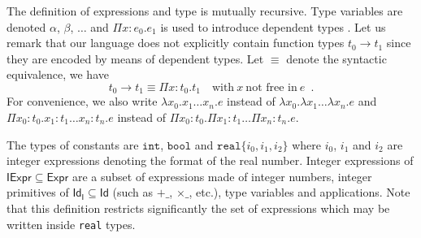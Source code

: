 The definition of expressions and type is mutually recursive.
 Type variables are denoted $\alpha$, $\beta$, $\ldots$
and $\Pi x:e_0.e_1$ is used to introduce dependent types \cite{Pie04}. 
Let us remark that our language does not explicitly contain function types $t_0 \rightarrow t_1$
since they are encoded by means of dependent types. Let $\equiv$ denote the syntactic equivalence, we have
\begin{equation}
t_0\rightarrow t_1  \equiv \Pi x:t_0.t_1\quad\text{with}\ x\ \text{not free in}\ e\enspace .
\end{equation}
For convenience, we also write $\lambda x_0.x_1\ldots x_n.e$ instead of
$\lambda x_0.\lambda x_1\ldots\lambda x_n.e$ and 
$\Pi x_0:t_0.x_1:t_1\ldots x_n:t_n.e$ instead of
$\Pi x_0:t_0.\Pi x_1:t_1\ldots \Pi x_n:t_n.e$.

The types of constants are $\mathtt{int}$, $\mathtt{bool}$ and $\mathtt{real\{}i_0,i_1,i_2\mathtt{\}}$ 
where $i_0$, $i_1$ and $i_2$ 
are integer expressions
denoting the format of the real number. Integer expressions of $\mathsf{IExpr}\subseteq\mathsf{Expr}$ 
are a subset of expressions made of integer numbers, integer primitives of 
$\mathsf{Id}_\mathsf{I}\subseteq \mathsf{Id}$ (such as $+\_$, $\times\_$, etc.), type variables and applications.
Note that this definition restricts significantly the set of expressions which may be written inside
\texttt{real} types.

